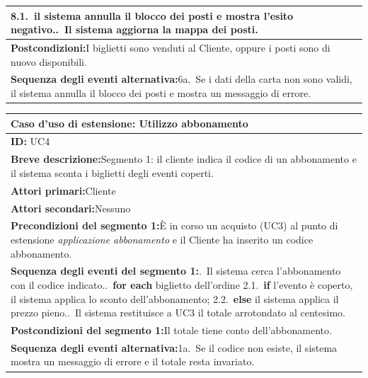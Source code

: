 \begin{center}
\begin{tabular}{|p{}|}
\hspace*{1em}8.1.~il sistema annulla il blocco dei posti e mostra l'esito negativo.\newline
9.~Il sistema aggiorna la mappa dei posti. \\ \hline
\textbf{Postcondizioni:}\newline I biglietti sono venduti al Cliente, oppure i posti sono di nuovo disponibili. \\ \hline
\textbf{Sequenza degli eventi alternativa:}\newline 6a.~Se i dati della carta non sono validi, il sistema annulla il blocco dei posti e mostra un messaggio di errore. \\ \hline
\end{tabular}
\end{center}

\begin{center}
\small
\begin{tabular}{|p{}|}
\hline
\textbf{Caso d'uso di estensione: Utilizzo abbonamento} \\ \hline
\textbf{ID:} UC4 \\ \hline
\textbf{Breve descrizione:}\newline Segmento 1: il cliente indica il codice di un abbonamento e il sistema sconta i biglietti degli eventi coperti. \\ \hline
\textbf{Attori primari:}\newline Cliente \\ \hline
\textbf{Attori secondari:}\newline Nessuno \\ \hline
\textbf{Precondizioni del segmento 1:}\newline È in corso un acquisto (UC3) al punto di estensione \emph{applicazione abbonamento} e il Cliente ha inserito un codice abbonamento. \\ \hline
\textbf{Sequenza degli eventi del segmento 1:}\newline 1.~Il sistema cerca l'abbonamento con il codice indicato.\newline
2.~\textbf{for each} biglietto dell'ordine\newline
\hspace*{1em}2.1.~\textbf{if} l'evento è coperto, il sistema applica lo sconto dell'abbonamento;\newline
\hspace*{1em}2.2.~\textbf{else} il sistema applica il prezzo pieno.\newline
3.~Il sistema restituisce a UC3 il totale arrotondato al centesimo. \\ \hline
\textbf{Postcondizioni del segmento 1:}\newline Il totale tiene conto dell'abbonamento. \\ \hline
\textbf{Sequenza degli eventi alternativa:}\newline 1a.~Se il codice non esiste, il sistema mostra un messaggio di errore e il totale resta invariato. \\ \hline
\end{tabular}
\end{center}

